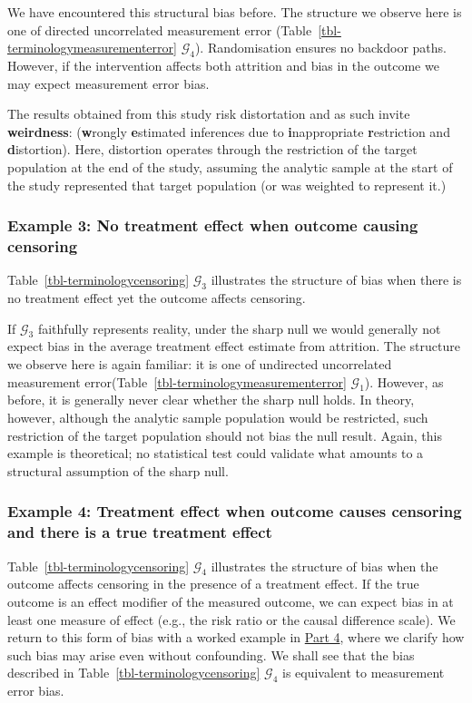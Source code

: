 \documentclass[
  single column]{article}
\begin{document}
We have encountered this structural bias before. The structure we
observe here is one of directed uncorrelated measurement error
(Table~\ref{tbl-terminologymeasurementerror} \(\mathcal{G}_4\)).
Randomisation ensures no backdoor paths. However, if the intervention
affects both attrition and bias in the outcome we may expect measurement
error bias.

The results obtained from this study risk distortation and as such
invite \textbf{weirdness}: (\textbf{w}rongly \textbf{e}stimated
inferences due to \textbf{i}nappropriate \textbf{r}estriction and
\textbf{d}istortion). Here, distortion operates through the restriction
of the target population at the end of the study, assuming the analytic
sample at the start of the study represented that target population (or
was weighted to represent it.)

\subsubsection{Example 3: No treatment effect when outcome causing
censoring}\label{example-3-no-treatment-effect-when-outcome-causing-censoring}

Table~\ref{tbl-terminologycensoring} \(\mathcal{G}_3\) illustrates the
structure of bias when there is no treatment effect yet the outcome
affects censoring.

If \(\mathcal{G}_3\) faithfully represents reality, under the sharp null
we would generally not expect bias in the average treatment effect
estimate from attrition. The structure we observe here is again
familiar: it is one of undirected uncorrelated measurement
error(Table~\ref{tbl-terminologymeasurementerror} \(\mathcal{G}_1\)).
However, as before, it is generally never clear whether the sharp null
holds. In theory, however, although the analytic sample population would
be restricted, such restriction of the target population should not bias
the null result. Again, this example is theoretical; no statistical test
could validate what amounts to a structural assumption of the sharp
null.

\subsubsection{Example 4: Treatment effect when outcome causes censoring
and there is a true treatment
effect}\label{example-4-treatment-effect-when-outcome-causes-censoring-and-there-is-a-true-treatment-effect}

Table~\ref{tbl-terminologycensoring} \(\mathcal{G}_4\) illustrates the
structure of bias when the outcome affects censoring in the presence of
a treatment effect. If the true outcome is an effect modifier of the
measured outcome, we can expect bias in at least one measure of effect
(e.g., the risk ratio or the causal difference scale). We return to this
form of bias with a worked example in \hyperref[id-sec-4]{Part 4}, where
we clarify how such bias may arise even without confounding. We shall
see that the bias described in Table~\ref{tbl-terminologycensoring}
\(\mathcal{G}_4\) is equivalent to measurement error bias.
\end{document}
